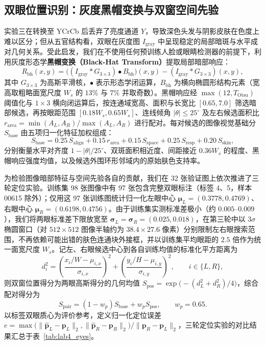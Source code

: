 \subsection{双眼位置识别：灰度黑帽变换与双窗空间先验}

实验三在转换至 YCrCb 后丢弃了亮度通道 $Y$，导致深色头发与阴影皮肤在色度上难以区分；但从五官结构看，双眼在灰度图 $I_{\text{gray}}$ 中呈现稳定的局部暗斑与水平成对几何关系\cite{hsu2002face}。受此启发，我们在不使用任何预训练人脸或眼睛检测器的前提下，利用灰度形态学\textbf{黑帽变换（Black-Hat Transform）}提取局部暗部响应：
\begin{equation}
R_{\text{bh}}(x,y) = \bigl((I_{\text{gray}} * G_{3\times3}) \bullet B_{\text{bh}}\bigr)(x,y) - (I_{\text{gray}} * G_{3\times3})(x,y),
\label{eq:blackhat}
\end{equation}
其中 $G_{3\times3}$ 为高斯平滑核，$\bullet$ 表示形态学闭运算，$B_{\text{bh}}$ 为横向椭圆形结构元素（宽高取粗略面宽尺度 $W_s$ 的 $13\%$ 与 $7\%$ 并取奇数）。黑帽响应经 $\max(12, T_{\text{Otsu}})$ 阈值化与 $1\times3$ 横向闭运算后，按连通域宽高、面积与长宽比 $[0.65, 7.0]$ 筛选暗部候选，再按眼距范围 $[0.18W_s, 0.65W_s]$、连线倾角 $|\theta|\le 25^\circ$ 及左右候选面积比 $r_{\text{area}}=\min(A_L,A_R)/\max(A_L,A_R)$ 进行配对。每对候选的图像视觉基础分 $S_{\text{base}}$ 由五项归一化特征加权组成：
\begin{equation}
S_{\text{base}} = 0.25\,S_{\text{align}} + 0.15\,r_{\text{area}} + 0.15\,S_{\text{space}} + 0.25\,S_{\text{resp}} + 0.20\,S_{\text{skin}},
\label{eq:eyebase}
\end{equation}
分别衡量水平对齐度 $1-|\theta|/25^\circ$、双斑面积相近度、间距接近 $0.36W_s$ 的程度、黑帽响应强度均值，以及候选外围环形邻域内的原始肤色支持率。

为检验图像暗部特征与空间先验各自的贡献，我们在 32 张验证图上依次推进了三轮定位实验。训练集 98 张图像中有 97 张包含完整双眼标注（标签 4、5，样本 00615 除外）；仅用这 97 张训练图统计归一化左眼中心 $\boldsymbol{\mu}_L=(0.3778, 0.4769)$、右眼中心 $\boldsymbol{\mu}_R=(0.6198, 0.4756)$。由于训练集实测标准差极小（约 $0.005\text{--}0.009$），我们将两眼标准差下限放宽至 $\boldsymbol{\sigma}_L=\boldsymbol{\sigma}_R=(0.025, 0.018)$，在第三轮中以 $3\sigma$ 椭圆窗口（对 $512\times512$ 图像半轴约为 $38.4\times27.6$ 像素）分别限制左右眼搜索范围，不再依赖可能出错的肤色连通块外接框，并以训练集平均眼距的 $2.5$ 倍作为统一面宽尺度 $W_s$。记左、右眼候选中心到各自训练均值的标准化平方距离为
\begin{equation}
d_i^2 = \left(\frac{x_i/W - \mu_{i,x}}{\sigma_{i,x}}\right)^2 + \left(\frac{y_i/H - \mu_{i,y}}{\sigma_{i,y}}\right)^2, \qquad i\in\{L,R\},
\label{eq:eyedist}
\end{equation}
则双窗位置得分为两眼高斯得分的几何均值 $S_{\text{pos}}=\exp\bigl(-(d_L^2+d_R^2)/4\bigr)$，综合配对得分为
\begin{equation}
S_{\text{pair}} = (1 - w_p)S_{\text{base}} + w_p S_{\text{pos}}, \qquad w_p = 0.65.
\label{eq:eyepairscore}
\end{equation}
以标签双眼质心为评价参考，定义归一化定位误差 $e = \max\bigl(\|\hat{\mathbf{p}}_L-\mathbf{p}_L\|_2, \|\hat{\mathbf{p}}_R-\mathbf{p}_R\|_2\bigr) / \|\mathbf{p}_R-\mathbf{p}_L\|_2$，三轮定位实验的对比结果汇总于表~\ref{tab:lab4_eyes}。


